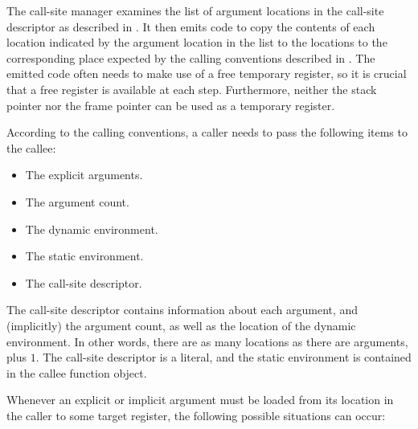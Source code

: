 The call-site manager examines the list of argument locations in the
call-site descriptor as described in
.  It then emits code to copy the
contents of each location indicated by the argument location in the
list to the locations to the corresponding place expected by the
calling conventions described in .
The emitted code often needs to make use of a free temporary register,
so it is crucial that a free register is available at each step.
Furthermore, neither the stack pointer nor the frame pointer can
be used as a temporary register.

According to the calling conventions, a caller needs to pass the
following items to the callee:

\begin{itemize}
\item The explicit arguments.
\item The argument count.
\item The dynamic environment.
\item The static environment.
\item The call-site descriptor.
\end{itemize}

The call-site descriptor contains information about each argument, and
(implicitly) the argument count, as well as the location of the
dynamic environment.  In other words, there are as many locations as
there are arguments, plus $1$. The call-site descriptor is a literal,
and the static environment is contained in the callee function object.

Whenever an explicit or implicit argument must be loaded from its
location in the caller to some target register, the following possible
situations can occur:

